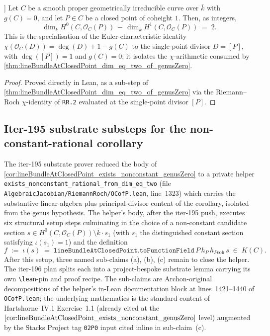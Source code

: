 \begin{theorem}\leanok
[The Euler-characteristic bridge \(H^0 - H^1 = 2\) at
\(D = [P]\)]
  \label{thm:lineBundleAtClosedPoint_h0_sub_h1_eq_two}
  Let \(C\) be a smooth proper geometrically irreducible curve over \(\bar k\)
  with \(g(C) = 0\), and let \(P \in C\) be a closed point of coheight \(1\).
  Then, as integers,
  \[
    \dim_{\bar k} H^0(C, \mathcal O_C(P))
    \,-\, \dim_{\bar k} H^1(C, \mathcal O_C(P)) \;=\; 2.
  \]
  This is the specialisation of the Euler-characteristic identity
  \(\chi(\mathcal O_C(D)) = \deg(D) + 1 - g(C)\) to the single-point divisor
  \(D = [P]\), with \(\deg([P]) = 1\) and \(g(C) = 0\); it isolates the
  \(\chi\)-arithmetic consumed by
  \cref{thm:lineBundleAtClosedPoint_dim_eq_two_of_genusZero}.
\end{theorem}

\begin{proof}
  Proved directly in Lean, as a sub-step of
  \cref{thm:lineBundleAtClosedPoint_dim_eq_two_of_genusZero} via the
  Riemann--Roch \(\chi\)-identity of \texttt{RR.2} evaluated at the
  single-point divisor \([P]\).
\end{proof}

\subsection{Iter-195 substrate substeps for the
  non-constant-rational corollary}
\label{subsec:lineBundleAtClosedPoint_substrate_substeps}

The iter-195 substrate prover reduced the body of
\cref{cor:lineBundleAtClosedPoint_exists_nonconstant_genusZero} to a
private helper \texttt{exists\_nonconstant\_rational\_from\_dim\_eq\_two}
(file \texttt{AlgebraicJacobian/RiemannRoch/OCofP.lean}, line~1323)
which carries the substantive linear-algebra plus principal-divisor
content of the corollary, isolated from the genus hypothesis. The
helper's body, after the iter-195 push, executes six structural setup
steps culminating in the choice of a non-constant candidate section
\(s\in H^0(C, \mathcal O_C(P))\setminus \bar k\cdot s_1\) (with
\(s_1\) the distinguished constant section satisfying
\(\iota(s_1)=1\)) and the definition
\[
  f \;:=\; \iota(s) \;=\;
  \texttt{lineBundleAtClosedPoint.toFunctionField}\,P\,h_P\,h_{P\mathrm{coh}}\,s
  \;\in\; K(C).
\]
After this setup, three named sub-claims (a), (b), (c) remain to close
the helper. The iter-196 plan splits each into a project-bespoke
substrate lemma carrying its own \texttt{\textbackslash lean}-pin and proof recipe. The
sub-claims are Archon-original decompositions of the helper's
in-Lean documentation block at lines~1421--1440 of
\texttt{OCofP.lean}; the underlying mathematics is the standard
content of Hartshorne~IV.1 Exercise~1.1 (already cited at the
\(\cref{cor:lineBundleAtClosedPoint_exists_nonconstant_genusZero}\)
level) augmented by the Stacks Project tag \texttt{02P0} input cited
inline in sub-claim~(c).

